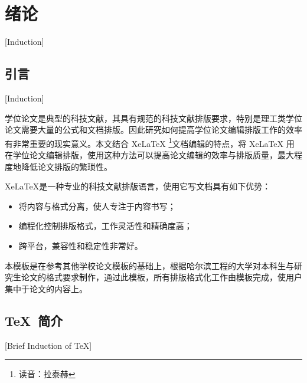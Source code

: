 
%
%
%


\chapter{绪论}[Induction]
\label{chap01}

\section{引言}[Induction]

学位论文是典型的科技文献，其具有规范的科技文献排版要求，特别是理工类学位论文需要大量的公式和文档排版。因此研究如何提高学位论文编辑排版工作的效率有非常重要的现实意义。本文结合 Xe\LaTeX{} \footnote{读音：拉泰赫}文档编辑的特点，将 Xe\LaTeX{} 用在学位论文编辑排版，使用这种方法可以提高论文编辑的效率与排版质量，最大程度地降低论文排版的繁琐性。

Xe\LaTeX{}是一种专业的科技文献排版语言，使用它写文档具有如下优势：

\begin{itemize}
  \item 将内容与格式分离，使人专注于内容书写；
  \item 编程化控制排版格式，工作灵活性和精确度高；
  \item 跨平台，兼容性和稳定性非常好。
\end{itemize}

本模板是在参考其他学校论文模板的基础上，根据哈尔滨工程的大学对本科生与研究生论文的格式要求制作，通过此模板，所有排版格式化工作由模板完成，使用户集中于论文的内容上。

\section{TeX~简介}[Brief Induction of TeX]

